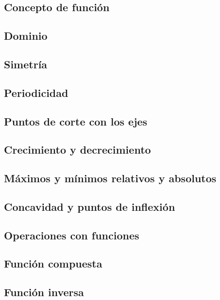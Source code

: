 \subsection{Concepto de función}


\subsection{Dominio}


\subsection{Simetría}


\subsection{Periodicidad}


\subsection{Puntos de corte con los ejes}


\subsection{Crecimiento y decrecimiento}


\subsection{Máximos y mínimos relativos y absolutos}


\subsection{Concavidad y puntos de inflexión}


\subsection{Operaciones con funciones}


\subsection{Función compuesta}


\subsection{Función inversa}

